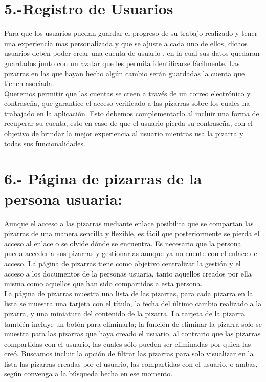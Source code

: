 \documentclass[a4paper, oneside, final]{scrartcl}
\begin{document}
\noindent
\section{5.-Registro de Usuarios} %

    Para que los usuarios puedan guardar el progreso de su trabajo realizado y tener una experiencia mas personalizada y que se ajuste a cada uno de ellos, dichos usuarios deben poder crear una cuenta de usuario , en la cual sus datos quedaran guardados junto con un avatar que les permita identificarse fácilmente. Las pizarras en las que hayan hecho algún cambio serán guardadas la cuenta que tienen asociada.\\
    
    Queremos permitir que las cuentas se creen a través de un correo electrónico y contraseña, que garantice el acceso verificado a las pizarras sobre los cuales ha trabajado en la aplicación. Esto debemos complementarlo al incluir una forma de recuperar su cuenta, esto en caso de que el usuario pierda su contraseña, con el objetivo de brindar la mejor experiencia al usuario mientras usa la pizarra y todas sus funcionalidades.



\noindent
\section{ 6.- Página de pizarras de la persona usuaria:}

Aunque el acceso a las pizarras mediante enlace posibilita que se compartan las pizarras de una manera sencilla y flexible, es fácil que posteriormente se pierda el acceso al enlace o se olvide dónde se encuentra. Es necesario que la persona pueda acceder a sus pizarras y gestionarlas aunque ya no cuente con el enlace de acceso. La página de pizarras tiene como objetivo centralizar la gestión y el acceso a los documentos de la personas usuaria, tanto aquellos creados por ella misma como aquellos que han sido compartidos a esta persona.\\

La página de pizarras muestra una lista de las pizarras, para cada pizarra en la lista se muestra una tarjeta con el título, la fecha del último cambio realizado a la pizarra, y una miniatura del contenido de la pizarra. La tarjeta de la pizarra también incluye un botón para eliminarla; la función de eliminar la pizarra solo se muestra para las pizarras que haya creado el usuario, al contrario que las pizarras compartidas con el usuario, las cuales sólo pueden ser eliminadas por quien las creó. Buscamos incluir la opción de filtrar las pizarras para solo visualizar en la lista las pizarras creadas por el usuario, las compartidas con el usuario, o ambas, según convenga a la búsqueda hecha en ese momento.
\end{document}
